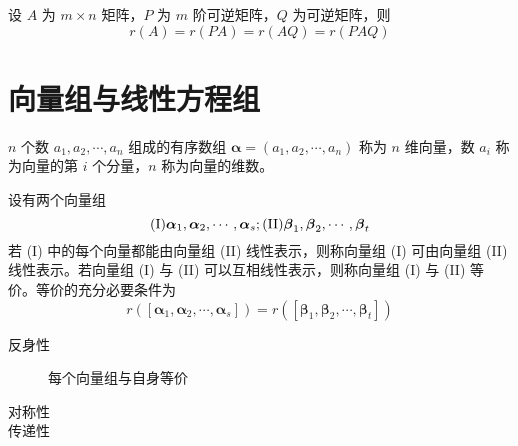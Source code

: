 \documentclass{ctexbook}
\begin{document}
\begin{theorem}[可逆矩阵乘积不变秩]
    设 $A$ 为 $m\times n$ 矩阵，$P$ 为 $m$ 阶可逆矩阵，$Q$ 为可逆矩阵，则
    \begin{equation}
        r(A)=r(PA)=r(AQ)=r(PAQ)
    \end{equation}
\end{theorem}

\chapter{向量组与线性方程组}

\begin{definition}[$n$ 维向量]
    $n$ 个数 $a_1,a_2,\cdots,a_n$ 组成的有序数组 $\boldsymbol{\alpha}=(a_1,a_2,\cdots,a_n)$ 称为 $n$ 维向量，数 $a_i$ 称为向量的第 $i$ 个分量，$n$ 称为向量的维数。
\end{definition}

\begin{definition}[向量组的等价]
    设有两个向量组
    \begin{equation}
        (\textnormal{I}) \boldsymbol{\alpha}_1, \boldsymbol{\alpha}_2, \cdots, \boldsymbol{\alpha}_s; (\textnormal{II}) \boldsymbol{\beta}_1, \boldsymbol{\beta}_2, \cdots, \boldsymbol{\beta}_t
    \end{equation}
    若 \textnormal{(I)} 中的每个向量都能由向量组 \textnormal{(II)} 线性表示，则称向量组 \textnormal{(I)} 可由向量组 \textnormal{(II)} 线性表示。若向量组 \textnormal{(I)} 与 \textnormal{(II)} 可以互相线性表示，则称向量组 \textnormal{(I)} 与 \textnormal{(II)} 等价。等价的充分必要条件为
    \begin{equation}
        r([\boldsymbol{\alpha}_1,\boldsymbol{\alpha}_2,\cdots,\boldsymbol{\alpha}_s])=r([\boldsymbol{\beta}_1,\boldsymbol{\beta}_2,\cdots,\boldsymbol{\beta}_t])
    \end{equation}
\end{definition}

\begin{proposition}[向量组等价关系性质]
    \begin{description}
        \item[反身性] 每个向量组与自身等价
        \item[对称性] 
        \item[传递性] 
    \end{description}
\end{proposition}
\end{document}
